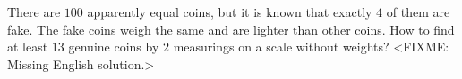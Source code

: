 \problem
There are $100$ apparently equal coins, but it is known that exactly $4$ of
them are fake.
The fake coins weigh the same and are lighter than other coins.
How to find at least $13$ genuine coins by $2$ measurings on a scale without
weights?
\solution
<FIXME: Missing English solution.>
\endproblem
